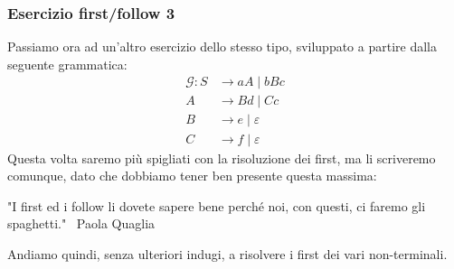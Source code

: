 \documentclass[class=book, crop=false, oneside, 12pt]{standalone}
\begin{document}
\subsubsection{Esercizio first/follow 3}
\label{first-folllow-ex-3}
Passiamo ora ad un'altro esercizio dello stesso tipo, sviluppato a partire dalla seguente grammatica:
\begin{align*}
    \mathcal{G}: S &\to aA \mid bBc \\
    A &\to Bd \mid Cc \\
    B &\to e \mid \varepsilon \\
    C &\to f \mid \varepsilon
\end{align*}
Questa volta saremo più spigliati con la risoluzione dei first, ma li scriveremo comunque, dato che dobbiamo tener ben presente questa massima:
\begin{displayquote}
    "I first ed i follow li dovete sapere bene perché noi, con questi, ci faremo gli spaghetti."
    ~Paola Quaglia
\end{displayquote}

\noindent Andiamo quindi, senza ulteriori indugi, a risolvere i first dei vari non-terminali.
\end{document}
